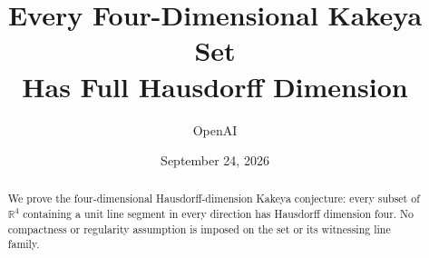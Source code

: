 \documentclass[11pt]{article}
\title{Every Four-Dimensional Kakeya Set\\Has Full Hausdorff Dimension}
\author{OpenAI}
\date{September 24, 2026}
\theoremstyle{definition}
\theoremstyle{remark}
\numberwithin{equation}{section}
\newcommand{\R}{\mathbb R}
\newcommand{\1}{\mathbf 1}
\begin{document}
\maketitle
\begin{abstract}
We prove the four-dimensional Hausdorff-dimension Kakeya conjecture:
every subset of \(\R^4\) containing a unit line segment in every
direction has Hausdorff dimension four. No compactness or regularity
assumption is imposed on the set or its witnessing line family.
\end{abstract}
\tableofcontents











\setlength{\bibsep}{6pt plus 1pt minus 1pt}


\end{document}

